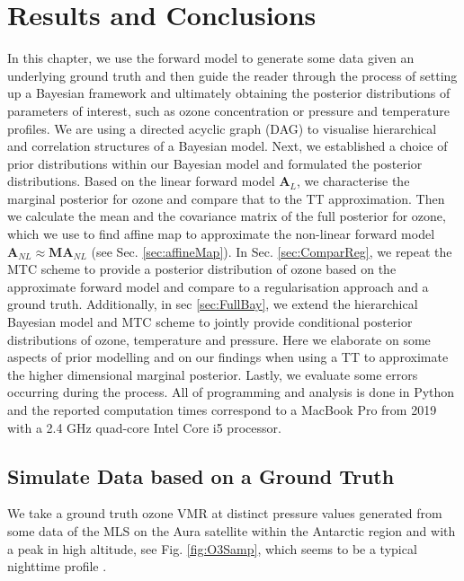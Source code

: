 \chapter{Results and Conclusions}
\label{ch:res}
In this chapter, we use the forward model to generate some data given an underlying ground truth and then guide the reader through the process of setting up a Bayesian framework and ultimately obtaining the posterior distributions of parameters of interest, such as ozone concentration or pressure and temperature profiles.
We are using a directed acyclic graph (DAG) to visualise hierarchical and correlation structures of a Bayesian model.
Next, we established a choice of prior distributions within our Bayesian model and formulated the posterior distributions.
Based on the linear forward model $\bm{A}_L$, we characterise the marginal posterior for ozone and compare that to the TT approximation.
Then we calculate the mean and the covariance matrix of the full posterior for ozone, which we use to find affine map to approximate the non-linear forward model $\bm{A}_{NL} \approx \bm{M} \bm{A}_{NL}$ (see Sec. \ref{sec:affineMap}).
In Sec. \ref{sec:ComparReg}, we repeat the MTC scheme to provide a posterior distribution of ozone based on the approximate forward model and compare to a regularisation approach and a ground truth.
Additionally, in sec \ref{sec:FullBay}, we extend the hierarchical Bayesian model and MTC scheme to jointly provide conditional posterior distributions of ozone, temperature and pressure.
Here we elaborate on some aspects of prior modelling and on our findings when using a TT to approximate the higher dimensional marginal posterior.
Lastly, we evaluate some errors occurring during the process.
All of programming and analysis is done in Python and the reported computation times correspond to a MacBook Pro from 2019 with a 2.4 GHz quad-core Intel Core i5 processor.
\clearpage
\section{Simulate Data based on a Ground Truth}
We take a ground truth ozone VMR at distinct pressure values generated from some data \cite{MLSdata} of the MLS on the Aura satellite within the Antarctic region and with a peak in high altitude, see Fig. \ref{fig:O3Samp}, which seems to be a typical nighttime profile \cite{Lee2020NightOzone}.

